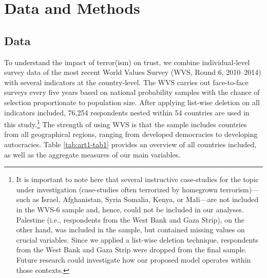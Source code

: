 \section{Data and Methods}
\subsection{Data}
To understand the impact of terror(ism) on trust, we combine individual-level survey data of the most recent World Values Survey (WVS, Round 6, 2010–2014) with several indicators at the country-level. The WVS carries out face-to-face surveys every five years based on national probability samples with the chance of selection proportionate to population size. After applying list-wise deletion on all indicators included, 76,254 respondents nested within 54 countries are used in this study.\footnote{It is important to note here that several instructive case-studies for the topic under investigation (case-studies often terrorized by homegrown terrorism)---such as Israel, Afghanistan, Syria Somalia, Kenya, or Mali---are not included in the WVS-6 sample and, hence, could not be included in our analyses. Palestine (i.e., respondents from the West Bank and Gaza Strip), on the other hand, was included in the sample, but contained missing values on crucial variables. Since we applied a list-wise deletion technique, respondents from the West Bank and Gaza Strip were dropped from the final sample. Future research could investigate how our proposed model operates within those contexts.} The strength of using WVS is that the sample includes countries from all geographical regions, ranging from developed democracies to developing autocracies. Table \ref{tab:art1-tab1} provides an overview of all countries included, as well as the aggregate measures of our main variables.

